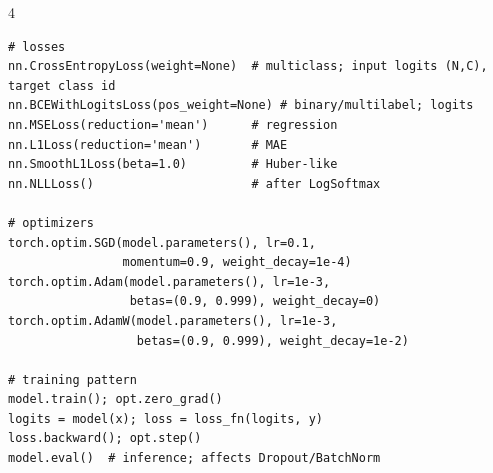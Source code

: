 \documentclass[10pt]{article}
\begin{document}
\begin{multicols*}{4}
\begin{lstlisting}
# losses
nn.CrossEntropyLoss(weight=None)  # multiclass; input logits (N,C), target class id
nn.BCEWithLogitsLoss(pos_weight=None) # binary/multilabel; logits
nn.MSELoss(reduction='mean')      # regression
nn.L1Loss(reduction='mean')       # MAE
nn.SmoothL1Loss(beta=1.0)         # Huber-like
nn.NLLLoss()                      # after LogSoftmax

# optimizers
torch.optim.SGD(model.parameters(), lr=0.1,
                momentum=0.9, weight_decay=1e-4)
torch.optim.Adam(model.parameters(), lr=1e-3,
                 betas=(0.9, 0.999), weight_decay=0)
torch.optim.AdamW(model.parameters(), lr=1e-3,
                  betas=(0.9, 0.999), weight_decay=1e-2)

# training pattern
model.train(); opt.zero_grad()
logits = model(x); loss = loss_fn(logits, y)
loss.backward(); opt.step()
model.eval()  # inference; affects Dropout/BatchNorm
\end{lstlisting}




\end{multicols*}
\end{document}
